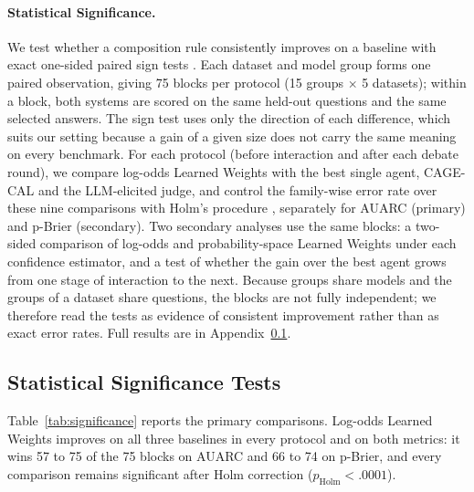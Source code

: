 
\paragraph{Statistical Significance.}
We test whether a composition rule consistently improves on a baseline with exact one-sided paired sign tests \citep{dixon1946sign}. Each dataset and model group forms one paired observation, giving 75 blocks per protocol (15 groups $\times$ 5 datasets); within a block, both systems are scored on the same held-out questions and the same selected answers. The sign test uses only the direction of each difference, which suits our setting because a gain of a given size does not carry the same meaning on every benchmark. For each protocol (before interaction and after each debate round), we compare log-odds Learned Weights with the best single agent, CAGE-CAL and the LLM-elicited judge, and control the family-wise error rate over these nine comparisons with Holm's procedure \citep{holm1979}, separately for AUARC (primary) and p-Brier (secondary). Two secondary analyses use the same blocks: a two-sided comparison of log-odds and probability-space Learned Weights under each confidence estimator, and a test of whether the gain over the best agent grows from one stage of interaction to the next. Because groups share models and the groups of a dataset share questions, the blocks are not fully independent; we therefore read the tests as evidence of consistent improvement rather than as exact error rates. Full results are in Appendix~\ref{app:significance}.



\subsection{Statistical Significance Tests}
\label{app:significance}






Table~\ref{tab:significance} reports the primary comparisons. Log-odds Learned Weights improves on all three baselines in every protocol and on both metrics: it wins 57 to 75 of the 75 blocks on AUARC and 66 to 74 on p-Brier, and every comparison remains significant after Holm correction ($p_{\mathrm{Holm}}<.0001$).

